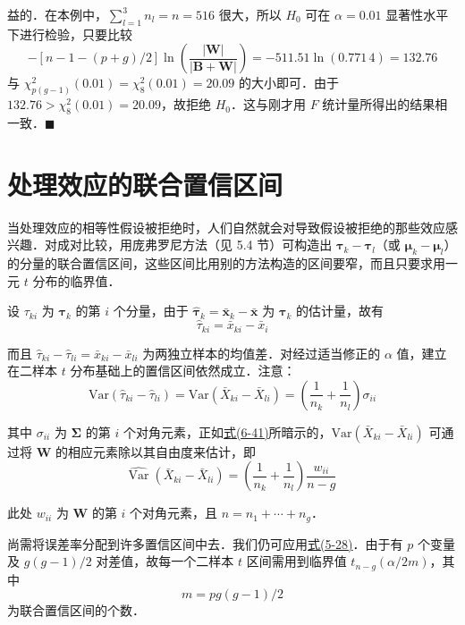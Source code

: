 
益的．在本例中，$\sum\limits_{l=1}^{3}n_l=n=516$ 很大，所以 $H_0$ 可在 $\alpha=0.01$ 显著性水平下进行检验，只要比较
\[
-\left[n-1-(p+g)/2\right]\ln\left(\frac{|\mathbf{W}|}{|\mathbf{B}+\mathbf{W}|}\right)=-511.51\ln(0.771\,4)=132.76
\]
与 $\chi_{p(g-1)}^{2}(0.01)=\chi_{8}^{2}(0.01)=20.09$ 的大小即可．由于 $132.76>\chi_{8}^{2}(0.01)=20.09$，故拒绝 $H_0$．这与刚才用 $F$ 统计量所得出的结果相一致．\hfill$\blacksquare$

\section{处理效应的联合置信区间}
\label{sec:6.5}

当处理效应的相等性假设被拒绝时，人们自然就会对导致假设被拒绝的那些效应感兴趣．对成对比较，用庞弗罗尼方法（见 5.4 节）可构造出 $\boldsymbol{\tau}_k-\boldsymbol{\tau}_l$（或 $\boldsymbol{\mu}_k-\boldsymbol{\mu}_l$）的分量的联合置信区间，这些区间比用别的方法构造的区间要窄，而且只要求用一元 $t$ 分布的临界值．

设 $\tau_{ki}$ 为 $\boldsymbol{\tau}_k$ 的第 $i$ 个分量，由于 $\hat{\boldsymbol{\tau}}_k=\bar{\mathbf{x}}_k-\bar{\mathbf{x}}$ 为 $\boldsymbol{\tau}_k$ 的估计量，故有
\label{eq:6-45}
\begin{equation}
\hat{\tau}_{ki}=\bar{x}_{ki}-\bar{x}_i \tag{6-45}
\end{equation}

而且 $\hat{\tau}_{ki}-\hat{\tau}_{li}=\bar{x}_{ki}-\bar{x}_{li}$ 为两独立样本的均值差．对经过适当修正的 $\alpha$ 值，建立在二样本 $t$ 分布基础上的置信区间依然成立．注意：
\[
\mathrm{Var}(\hat{\tau}_{ki}-\hat{\tau}_{li})=\mathrm{Var}(\bar{X}_{ki}-\bar{X}_{li})=\left(\frac{1}{n_k}+\frac{1}{n_l}\right)\sigma_{ii}
\]

其中 $\sigma_{ii}$ 为 $\boldsymbol{\Sigma}$ 的第 $i$ 个对角元素，正如\hyperref[eq:6-41]{式(6-41)}所暗示的，$\mathrm{Var}(\bar{X}_{ki}-\bar{X}_{li})$ 可通过将 $\mathbf{W}$ 的相应元素除以其自由度来估计，即
\[
\widehat{\mathrm{Var}}\;(\bar{X}_{ki}-\bar{X}_{li})=\left(\frac{1}{n_k}+\frac{1}{n_l}\right)\frac{w_{ii}}{n-g}
\]

此处 $w_{ii}$ 为 $\mathbf{W}$ 的第 $i$ 个对角元素，且 $n=n_1+\cdots+n_g$．

尚需将误差率分配到许多置信区间中去．我们仍可应用\hyperref[eq:5-28]{式(5-28)}．由于有 $p$ 个变量及 $g(g-1)/2$ 对差值，故每一个二样本 $t$ 区间需用到临界值 $t_{n-g}(\alpha/2m)$，其中
\label{eq:6-46}
\begin{equation}
m=pg(g-1)/2 \tag{6-46}
\end{equation}
为联合置信区间的个数．


